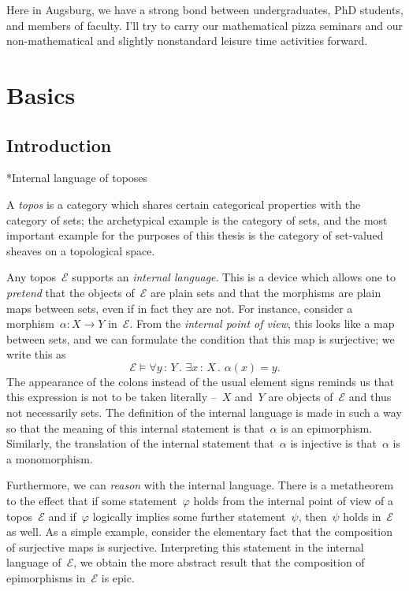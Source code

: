 \documentclass[10pt,reqno,a4paper]{amsbook}
\makeatletter
\theoremstyle{definition}
\theoremstyle{plain}
\theoremstyle{remark}
\newcommand{\E}{\mathcal{E}}
\newcommand{\?}{\,{:}\,}
\renewcommand{\_}{\mathpunct{.}\,}
\newcommand{\nocontentsline}[3]{}
\newcommand{\tocless}[1]{\let\addcontentsline=\nocontentsline}
\def\subsection{\@startsection{subsection}{2}%
  {0pt}{.5\linespacing\@plus.7\linespacing}{-.5em}%
  {\normalfont\bfseries}}
\makeatother
\begin{document}
{Here in Augsburg, we have a strong bond between undergraduates, PhD students,
and members of faculty. I'll try to carry our mathematical pizza seminars and
our non-mathematical and slightly nonstandard leisure time activities forward.

}


\setcounter{tocdepth}{1}
\tableofcontents


\chapter{Basics}

\section{Introduction}

{\tocless

\subsection*{Internal language of toposes}

A \emph{topos} is a category which shares certain categorical properties with
the category of sets; the archetypical example is the category of sets, and
the most important example for the purposes of this thesis is the category of
set-valued sheaves on a topological space.

Any topos~$\E$ supports an \emph{internal language}. This is a device which
allows one to \emph{pretend} that the objects of~$\E$ are plain sets and that
the morphisms are plain maps between sets, even if in fact they are not. For
instance, consider a morphism~$\alpha : X \to Y$ in~$\E$. From the \emph{internal
point of view}, this looks like a map between sets, and we can formulate the
condition that this map is surjective; we write this as
\[ \E \models \forall y\?Y\_ \exists x\?X\_ \alpha(x) = y. \]
The appearance of the colons instead of the usual element signs reminds us that
this expression is not to be taken literally --~$X$ and~$Y$ are objects of~$\E$
and thus not necessarily sets. The definition of the internal language is made
in such a way so that the meaning of this internal statement is that~$\alpha$
is an epimorphism. Similarly, the translation of the internal statement
that~$\alpha$ is injective is that~$\alpha$ is a monomorphism.

Furthermore, we can \emph{reason} with the internal language. There is a
metatheorem to the effect that if some statement~$\varphi$ holds from the
internal point of view of a topos~$\E$ and if~$\varphi$ logically implies some
further statement~$\psi$, then~$\psi$ holds in~$\E$ as well. As a simple
example, consider the elementary fact that the composition of surjective maps
is surjective. Interpreting this statement in the internal language of~$\E$, we
obtain the more abstract result that the composition of epimorphisms in~$\E$ is
epic.

}
\end{document}
